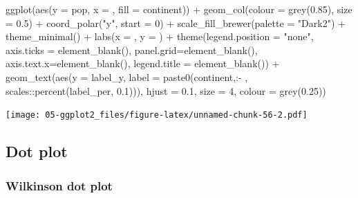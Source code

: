 \documentclass[
]{book}
\newenvironment{Shaded}{\begin{snugshade}}{\end{snugshade}}
\newcommand{\AttributeTok}[1]{\textcolor[rgb]{0.77,0.63,0.00}{#1}}
\newcommand{\DecValTok}[1]{\textcolor[rgb]{0.00,0.00,0.81}{#1}}
\newcommand{\FloatTok}[1]{\textcolor[rgb]{0.00,0.00,0.81}{#1}}
\newcommand{\FunctionTok}[1]{\textcolor[rgb]{0.00,0.00,0.00}{#1}}
\newcommand{\NormalTok}[1]{#1}
\newcommand{\SpecialCharTok}[1]{\textcolor[rgb]{0.00,0.00,0.00}{#1}}
\newcommand{\StringTok}[1]{\textcolor[rgb]{0.31,0.60,0.02}{#1}}
\begin{document}
\begin{Shaded}
\begin{Highlighting}[]
\FunctionTok{ggplot}\NormalTok{(}\FunctionTok{aes}\NormalTok{(}\AttributeTok{y =}\NormalTok{ pop, }\AttributeTok{x =} \StringTok{\textquotesingle{}\textquotesingle{}}\NormalTok{, }\AttributeTok{fill =}\NormalTok{ continent)) }\SpecialCharTok{+} 
   \FunctionTok{geom\_col}\NormalTok{(}\AttributeTok{colour =} \FunctionTok{grey}\NormalTok{(}\FloatTok{0.85}\NormalTok{), }\AttributeTok{size =} \FloatTok{0.5}\NormalTok{) }\SpecialCharTok{+}
   \FunctionTok{coord\_polar}\NormalTok{(}\StringTok{"y"}\NormalTok{, }\AttributeTok{start =} \DecValTok{0}\NormalTok{) }\SpecialCharTok{+}
   \FunctionTok{scale\_fill\_brewer}\NormalTok{(}\AttributeTok{palette =} \StringTok{"Dark2"}\NormalTok{) }\SpecialCharTok{+}
   \FunctionTok{theme\_minimal}\NormalTok{() }\SpecialCharTok{+}
   \FunctionTok{labs}\NormalTok{(}\AttributeTok{x =} \StringTok{\textquotesingle{}\textquotesingle{}}\NormalTok{, }\AttributeTok{y =} \StringTok{\textquotesingle{}\textquotesingle{}}\NormalTok{) }\SpecialCharTok{+}
   \FunctionTok{theme}\NormalTok{(}\AttributeTok{legend.position =} \StringTok{"none"}\NormalTok{, }
         \AttributeTok{axis.ticks =} \FunctionTok{element\_blank}\NormalTok{(),}
         \AttributeTok{panel.grid=}\FunctionTok{element\_blank}\NormalTok{(), }
         \AttributeTok{axis.text.x=}\FunctionTok{element\_blank}\NormalTok{(), }
         \AttributeTok{legend.title =} \FunctionTok{element\_blank}\NormalTok{()) }\SpecialCharTok{+}
\FunctionTok{geom\_text}\NormalTok{(}\FunctionTok{aes}\NormalTok{(}\AttributeTok{y =}\NormalTok{ label\_y, }\AttributeTok{label =} \FunctionTok{paste0}\NormalTok{(continent,}\StringTok{\textquotesingle{}:{-} \textquotesingle{}}\NormalTok{, scales}\SpecialCharTok{::}\FunctionTok{percent}\NormalTok{(label\_per, }\FloatTok{0.1}\NormalTok{))), }
          \AttributeTok{hjust =} \FloatTok{0.1}\NormalTok{, }\AttributeTok{size =} \DecValTok{4}\NormalTok{, }\AttributeTok{colour =} \FunctionTok{grey}\NormalTok{(}\FloatTok{0.25}\NormalTok{))}
\end{Highlighting}
\end{Shaded}

\texttt{[image: 05-ggplot2\_files/figure-latex/unnamed-chunk-56-2.pdf]}

\hypertarget{dot-plot}{%
\subsection{Dot plot}\label{dot-plot}}

\hypertarget{wilkinson-dot-plot}{%
\subsubsection{Wilkinson dot plot}\label{wilkinson-dot-plot}}
\end{document}
